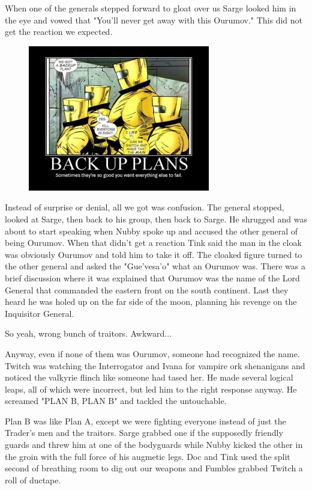 When one of the generals stepped forward to gloat over us Sarge looked him in the eye and vowed that "You'll never get away with this Ourumov." This did not get the reaction we expected.

\begin{figure}
	\begin{center}
		\includegraphics[width=\figwidth]{pics/9/47.png}
	\end{center}
\end{figure}
Instead of surprise or denial, all we got was confusion. 
The general stopped, looked at Sarge, then back to his group, then back to Sarge. 
He shrugged and was about to start speaking when Nubby spoke up and accused the other general of being Ourumov. 
When that didn't get a reaction Tink said the man in the cloak was obviously Ourumov and told him to take it off. 
The cloaked figure turned to the other general and asked the "Gue'vesa'o" what an Ourumov was. 
There was a brief discussion where it was explained that Ourumov was the name of the Lord General that commanded the eastern front on the south continent. 
Last they heard he was holed up on the far side of the moon, planning his revenge on the Inquisitor General.

So yeah, wrong bunch of traitors. 
Awkward...

Anyway, even if none of them was Ourumov, someone had recognized the name. 
Twitch was watching the Interrogator and Ivana for vampire ork shenanigans and noticed the valkyrie flinch like someone had tased her. 
He made several logical leaps, all of which were incorrect, but led him to the right response anyway. 
He screamed "PLAN B, PLAN B" and tackled the untouchable.

Plan B was like Plan A, except we were fighting everyone instead of just the Trader's men and the traitors. 
Sarge grabbed one if the supposedly friendly guards and threw him at one of the bodyguards while Nubby kicked the other in the groin with the full force of his augmetic legs. 
Doc and Tink used the split second of breathing room to dig out our weapons and Fumbles grabbed Twitch a roll of ductape.

